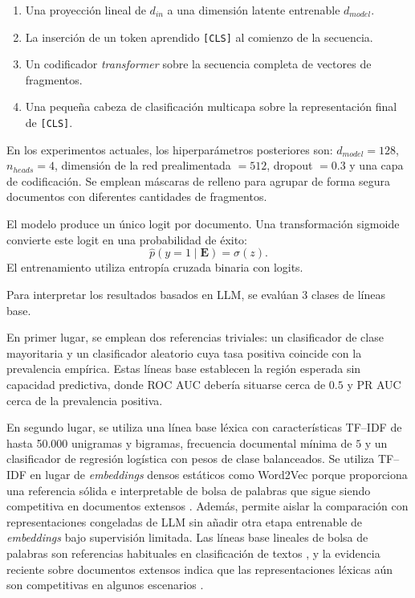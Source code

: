 \begin{enumerate}
  \item Una proyección lineal de $d_{in}$ a una dimensión latente entrenable $d_{model}$.
  \item La inserción de un token aprendido \texttt{[CLS]} al comienzo de la secuencia.
  \item Un codificador \textit{transformer} sobre la secuencia completa de vectores de fragmentos.
  \item Una pequeña cabeza de clasificación multicapa sobre la representación final de \texttt{[CLS]}.
\end{enumerate}

En los experimentos actuales, los hiperparámetros posteriores son: $d_{model}=128$, $n_{heads}=4$, dimensión de la red prealimentada $=512$, dropout $=0.3$ y una capa de codificación. Se emplean máscaras de relleno para agrupar de forma segura documentos con diferentes cantidades de fragmentos.

El modelo produce un único logit por documento. Una transformación sigmoide convierte este logit en una probabilidad de éxito:
\[
\hat{p}(y=1 \mid \mathbf{E}) = \sigma(z).
\]
El entrenamiento utiliza entropía cruzada binaria con logits.

Para interpretar los resultados basados en LLM, se evalúan 3 clases de líneas base.

En primer lugar, se emplean dos referencias triviales: un clasificador de clase mayoritaria y un clasificador aleatorio cuya tasa positiva coincide con la prevalencia empírica. Estas líneas base establecen la región esperada sin capacidad predictiva, donde ROC AUC debería situarse cerca de $0.5$ y PR AUC cerca de la prevalencia positiva.

En segundo lugar, se utiliza una línea base léxica con características TF--IDF de hasta 50.000 unigramas y bigramas, frecuencia documental mínima de $5$ y un clasificador de regresión logística con pesos de clase balanceados. Se utiliza TF--IDF en lugar de \textit{embeddings} densos estáticos como Word2Vec porque proporciona una referencia sólida e interpretable de bolsa de palabras que sigue siendo competitiva en documentos extensos \parencite{wang2012baselines,alvaprincipe2025survey}. Además, permite aislar la comparación con representaciones congeladas de LLM sin añadir otra etapa entrenable de \textit{embeddings} bajo supervisión limitada. Las líneas base lineales de bolsa de palabras son referencias habituales en clasificación de textos \parencite{wang2012baselines}, y la evidencia reciente sobre documentos extensos indica que las representaciones léxicas aún son competitivas en algunos escenarios \parencite{alvaprincipe2025survey}.

